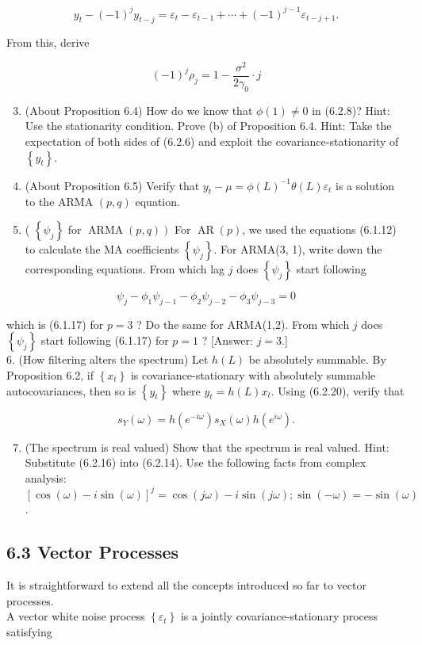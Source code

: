 \documentclass[10pt]{article}
\begin{document}
$$
y_{t}-(-1)^{j} y_{t-j}=\varepsilon_{t}-\varepsilon_{t-1}+\cdots+(-1)^{j-1} \varepsilon_{t-j+1} .
$$

From this, derive

$$
(-1)^{j} \rho_{j}=1-\frac{\sigma^{2}}{2 \gamma_{0}} \cdot j
$$

\begin{enumerate}
  \setcounter{enumi}{2}
  \item (About Proposition 6.4) How do we know that $\phi(1) \neq 0$ in (6.2.8)? Hint: Use the stationarity condition. Prove (b) of Proposition 6.4. Hint: Take the expectation of both sides of (6.2.6) and exploit the covariance-stationarity of $\left\{y_{t}\right\}$.
  \item (About Proposition 6.5) Verify that $y_{t}-\mu=\phi(L)^{-1} \theta(L) \varepsilon_{t}$ is a solution to the ARMA $(p, q)$ equation.
  \item ( $\left\{\psi_{j}\right\}$ for $\left.\operatorname{ARMA}(p, q)\right)$ For $\operatorname{AR}(p)$, we used the equations (6.1.12) to calculate the MA coefficients $\left\{\psi_{j}\right\}$. For ARMA(3, 1), write down the corresponding equations. From which lag $j$ does $\left\{\psi_{j}\right\}$ start following
\end{enumerate}

$$
\psi_{j}-\phi_{1} \psi_{j-1}-\phi_{2} \psi_{j-2}-\phi_{3} \psi_{j-3}=0
$$

which is (6.1.17) for $p=3$ ? Do the same for ARMA(1,2). From which $j$ does $\left\{\psi_{j}\right\}$ start following (6.1.17) for $p=1$ ? [Answer: $j=3$.]\\
6. (How filtering alters the spectrum) Let $h(L)$ be absolutely summable. By Proposition 6.2, if $\left\{x_{t}\right\}$ is covariance-stationary with absolutely summable autocovariances, then so is $\left\{y_{t}\right\}$ where $y_{t}=h(L) x_{t}$. Using (6.2.20), verify that

$$
s_{Y}(\omega)=h\left(e^{-i \omega}\right) s_{X}(\omega) h\left(e^{i \omega}\right) .
$$

\begin{enumerate}
  \setcounter{enumi}{6}
  \item (The spectrum is real valued) Show that the spectrum is real valued. Hint: Substitute (6.2.16) into (6.2.14). Use the following facts from complex analysis: $[\cos (\omega)-i \sin (\omega)]^{j}=\cos (j \omega)-i \sin (j \omega) ; \sin (-\omega)=-\sin (\omega)$.
\end{enumerate}

\subsection*{6.3 Vector Processes}
It is straightforward to extend all the concepts introduced so far to vector processes.\\
A vector white noise process $\left\{\varepsilon_{t}\right\}$ is a jointly covariance-stationary process satisfying
\end{document}
